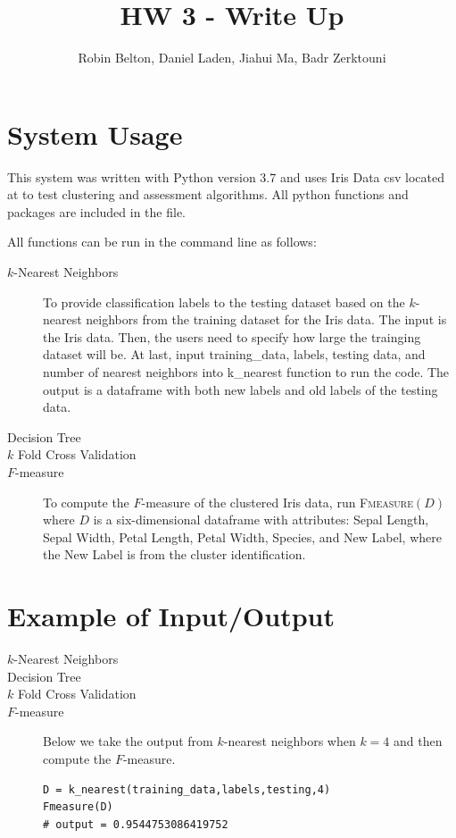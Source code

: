 \documentclass[psamsfonts,onesided,10pt]{amsart}
\title{HW 3 - Write Up}
\author{Robin Belton, Daniel Laden, Jiahui Ma,  Badr Zerktouni}
\begin{document}
\maketitle

\section{System Usage}

This system was written with Python version 3.7 and uses Iris Data csv located at  
to test clustering and assessment algorithms. All python functions and packages are included in the  file.

All functions can be run in the command line as follows:

\begin{description}
\item[$k$-Nearest Neighbors] To provide classification labels to the testing dataset based on the $k$-nearest neighbors from the training dataset for the Iris data. The input is the Iris data. Then, the users need to specify how large the trainging dataset will be. At last, input training_data, labels, testing data, and number of nearest neighbors into k_nearest function to run the code. The output is a dataframe with both new labels and old labels of the testing data.
\item[Decision Tree] 
\item[$k$ Fold Cross Validation] 
\item[$F$-measure] To compute the $F$-measure of the clustered Iris data, run \textsc{Fmeasure}$(D)$ 
where $D$ is a six-dimensional dataframe with attributes: Sepal Length, Sepal Width, Petal Length, Petal Width,
              Species, and New Label, where the New Label is from the cluster identification. 
\end{description}
 
\section{Example of Input/Output}
\begin{description}
\item[$k$-Nearest Neighbors] \todo{}

\item[Decision Tree] \todo{}

\item[$k$ Fold Cross Validation] \todo{}

\item[$F$-measure] Below we take the output from $k$-nearest neighbors when $k=4$ and then compute the $F$-measure. 
\begin{verbatim}
D = k_nearest(training_data,labels,testing,4)
Fmeasure(D)
# output = 0.9544753086419752
\end{verbatim}
\end{description}
\end{document}
